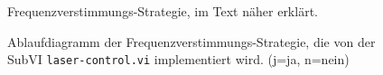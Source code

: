 \begin{figure}[h]
 	\centering
	\caption[Frequenzverstimmungs-Strategie]{Frequenzverstimmungs-Strategie,
	im Text näher erklärt.}
	\label{fig:frequenzverstimmungs-strategie}
\end{figure}
\begin{figure}[hp]
 	\centering
	\caption[Frequenzverstimmungs-Strategie
	-
	Ablaufdiagramm]{Ablaufdiagramm der Frequenzverstimmungs-Strategie, die von der
	SubVI \lstinline|laser-control.vi| implementiert wird. (j=ja, n=nein)}
	\label{fig:frequenzverstimmungs-strategie_ablaufdiagramm}
\end{figure}
